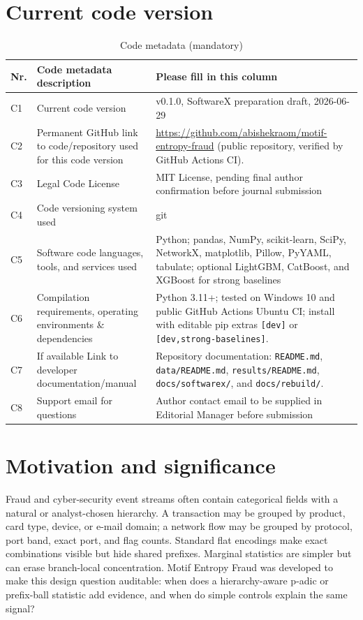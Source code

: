 \documentclass[preprint,12pt,a4paper]{elsarticle}
\begin{document}
\section*{Current code version}
\begin{table}[!h]
\begin{tabular}{|l|p{6.5cm}|p{6.5cm}|}
\hline
\textbf{Nr.} & \textbf{Code metadata description} & \textbf{Please fill in this column} \\
\hline
C1 & Current code version & v0.1.0, SoftwareX preparation draft, 2026-06-29 \\
\hline
C2 & Permanent GitHub link to code/repository used for this code version & \url{https://github.com/abishekraom/motif-entropy-fraud} (public repository, verified by GitHub Actions CI). \\
\hline
C3 & Legal Code License & MIT License, pending final author confirmation before journal submission \\
\hline
C4 & Code versioning system used & git \\
\hline
C5 & Software code languages, tools, and services used & Python; pandas, NumPy, scikit-learn, SciPy, NetworkX, matplotlib, Pillow, PyYAML, tabulate; optional LightGBM, CatBoost, and XGBoost for strong baselines \\
\hline
C6 & Compilation requirements, operating environments \& dependencies & Python 3.11+; tested on Windows 10 and public GitHub Actions Ubuntu CI; install with editable pip extras \texttt{[dev]} or \texttt{[dev,strong-baselines]}. \\
\hline
C7 & If available Link to developer documentation/manual & Repository documentation: \texttt{README.md}, \texttt{data/README.md}, \texttt{results/README.md}, \texttt{docs/softwarex/}, and \texttt{docs/rebuild/}. \\
\hline
C8 & Support email for questions & Author contact email to be supplied in Editorial Manager before submission \\
\hline
\end{tabular}
\caption{Code metadata (mandatory)}
\end{table}

\section{Motivation and significance}
Fraud and cyber-security event streams often contain categorical fields with a natural or analyst-chosen hierarchy. A transaction may be grouped by product, card type, device, or e-mail domain; a network flow may be grouped by protocol, port band, exact port, and flag counts. Standard flat encodings make exact combinations visible but hide shared prefixes. Marginal statistics are simpler but can erase branch-local concentration. Motif Entropy Fraud was developed to make this design question auditable: when does a hierarchy-aware p-adic or prefix-ball statistic add evidence, and when do simple controls explain the same signal?
\end{document}
